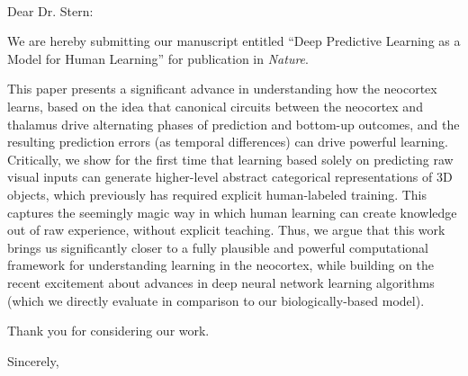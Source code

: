 \documentclass[11pt]{letter}
\begin{document}
\begin{letter}
{ \hspace*{.25in}\\}

\opening{Dear Dr. Stern:}

We are hereby submitting our manuscript entitled ``Deep Predictive Learning as a Model for Human Learning'' for publication in {\em Nature}.

This paper presents a significant advance in understanding how the neocortex learns, based on the idea that canonical circuits between the neocortex and thalamus drive alternating phases of prediction and bottom-up outcomes, and the resulting prediction errors (as temporal differences) can drive powerful learning.  Critically, we show for the first time that learning based solely on predicting raw visual inputs can generate higher-level abstract categorical representations of 3D objects, which previously has required explicit human-labeled training.  This captures the seemingly magic way in which human learning can create knowledge out of raw experience, without explicit teaching.  Thus, we argue that this work brings us significantly closer to a fully plausible and powerful computational framework for understanding learning in the neocortex, while building on the recent excitement about advances in deep neural network learning algorithms (which we directly evaluate in comparison to our biologically-based model).

Thank you for considering our work.

\closing{Sincerely,}


\end{letter}
\end{document}
